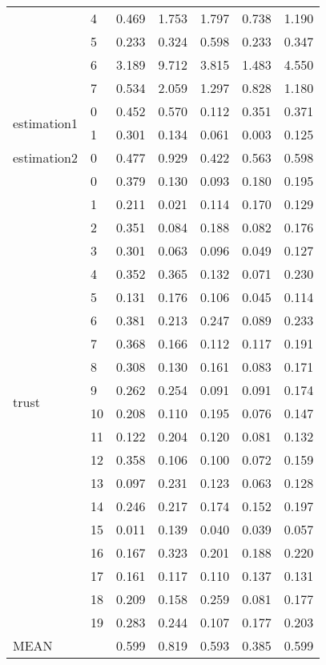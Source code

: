\begin{table}
\begin{tabular}{llrrrrr}
 & 4 & 0.469 & 1.753 & 1.797 & 0.738 & 1.190 \\
 & 5 & 0.233 & 0.324 & 0.598 & 0.233 & 0.347 \\
 & 6 & 3.189 & 9.712 & 3.815 & 1.483 & 4.550 \\
 & 7 & 0.534 & 2.059 & 1.297 & 0.828 & 1.180 \\
\cline{1-7}
\multirow[t]{2}{*}{estimation1} & 0 & 0.452 & 0.570 & 0.112 & 0.351 & 0.371 \\
 & 1 & 0.301 & 0.134 & 0.061 & 0.003 & 0.125 \\
\cline{1-7}
estimation2 & 0 & 0.477 & 0.929 & 0.422 & 0.563 & 0.598 \\
\cline{1-7}
\multirow[t]{20}{*}{trust} & 0 & 0.379 & 0.130 & 0.093 & 0.180 & 0.195 \\
 & 1 & 0.211 & 0.021 & 0.114 & 0.170 & 0.129 \\
 & 2 & 0.351 & 0.084 & 0.188 & 0.082 & 0.176 \\
 & 3 & 0.301 & 0.063 & 0.096 & 0.049 & 0.127 \\
 & 4 & 0.352 & 0.365 & 0.132 & 0.071 & 0.230 \\
 & 5 & 0.131 & 0.176 & 0.106 & 0.045 & 0.114 \\
 & 6 & 0.381 & 0.213 & 0.247 & 0.089 & 0.233 \\
 & 7 & 0.368 & 0.166 & 0.112 & 0.117 & 0.191 \\
 & 8 & 0.308 & 0.130 & 0.161 & 0.083 & 0.171 \\
 & 9 & 0.262 & 0.254 & 0.091 & 0.091 & 0.174 \\
 & 10 & 0.208 & 0.110 & 0.195 & 0.076 & 0.147 \\
 & 11 & 0.122 & 0.204 & 0.120 & 0.081 & 0.132 \\
 & 12 & 0.358 & 0.106 & 0.100 & 0.072 & 0.159 \\
 & 13 & 0.097 & 0.231 & 0.123 & 0.063 & 0.128 \\
 & 14 & 0.246 & 0.217 & 0.174 & 0.152 & 0.197 \\
 & 15 & 0.011 & 0.139 & 0.040 & 0.039 & 0.057 \\
 & 16 & 0.167 & 0.323 & 0.201 & 0.188 & 0.220 \\
 & 17 & 0.161 & 0.117 & 0.110 & 0.137 & 0.131 \\
 & 18 & 0.209 & 0.158 & 0.259 & 0.081 & 0.177 \\
 & 19 & 0.283 & 0.244 & 0.107 & 0.177 & 0.203 \\
\cline{1-7}
MEAN &  & 0.599 & 0.819 & 0.593 & 0.385 & 0.599 \\
\cline{1-7}
\bottomrule
\end{tabular}
\end{table}
